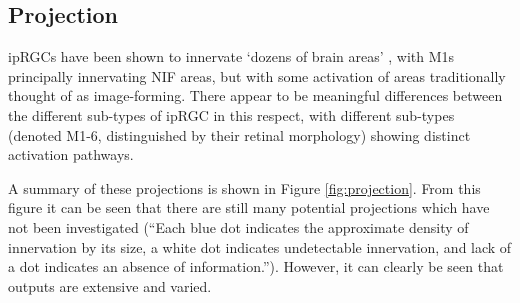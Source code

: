 \subsection{Projection}

\glspl{ipRGC} have been shown to innervate `dozens of brain areas' \citep{do_melanopsin_2019}, with M1s principally innervating \gls{NIF} areas, but with some activation of areas traditionally thought of as image-forming. There appear to be meaningful differences between the different sub-types of \gls{ipRGC} in this respect, with different sub-types (denoted M1-6, distinguished by their retinal morphology) showing distinct activation pathways. 

A summary of these projections is shown in Figure \ref{fig:projection}. From this figure it can be seen that there are still many potential projections which have not been investigated (``Each blue dot indicates the approximate density of innervation by its size, a white dot indicates undetectable innervation, and lack of a dot indicates an absence of information.''). However, it can clearly be seen that outputs are extensive and varied.

